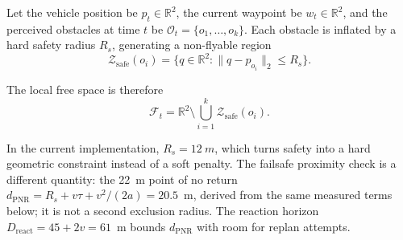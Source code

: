 \documentclass[electronics,article,submit,moreauthors]{Definitions/mdpi}
\begin{document}
Let the vehicle position be \(p_t \in \mathbb{R}^2\), the current waypoint be \(w_t \in \mathbb{R}^2\), and the perceived obstacles at time \(t\) be \(\mathcal{O}_t = \{o_1,\dots,o_k\}\). Each obstacle is inflated by a hard safety radius \(R_s\), generating a non-flyable region
\begin{equation}
    \mathcal{Z}_{\mathrm{safe}}(o_i) = \{q \in \mathbb{R}^2 : \lVert q - p_{o_i} \rVert_2 \le R_s\}.
\end{equation}

The local free space is therefore
\begin{equation}
    \mathcal{F}_t = \mathbb{R}^2 \setminus \bigcup_{i=1}^{k} \mathcal{Z}_{\mathrm{safe}}(o_i).
\end{equation}

In the current implementation, $R_s = 12~m$, which turns safety into a hard geometric constraint instead of a soft penalty. The failsafe proximity check is a different quantity: the 22~m point of no return $d_{\mathrm{PNR}} = R_s + v\tau + v^2/(2a) = 20.5$~m, derived from the same measured terms below; it is not a second exclusion radius. The reaction horizon $D_{\mathrm{react}}=45+2v=61$~m bounds $d_{\mathrm{PNR}}$ with room for replan attempts.
\end{document}
